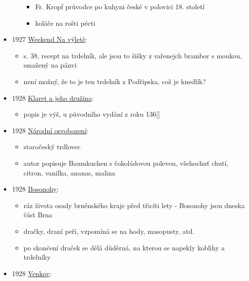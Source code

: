 \begin{itemize}
\begin{itemize}
    \begin{itemize}
    \tightlist
    \item
      Fr. Kropf průvodce po kuhyni české v polovici 18. století
    \item
      koláče na rošti pécti
    \end{itemize}
  \end{itemize}
\item
  1927
  \href{https://ndk.cz/view/uuid:a6e51320-373c-11ee-973a-005056827e51?page=uuid\%3A7905381e-5d69-48f7-97ca-9e0d2c8b5023&fulltext=trdeln\%C3\%ADk}{Weekend
  Na výletě}:

  \begin{itemize}
  \tightlist
  \item
    s. 38, recept na trdelník, ale jsou to šišky z vařenejch brambor s
    moukou, smažený na pánvi
  \item
    není možný, že to je ten trdelník z Podřipska, což je knedlík?
  \end{itemize}
\item
  1928
  \href{https://sources.cms.flu.cas.cz/src/index.php?s=v&bookid=833&page=3}{Klaret
  a jeho družina}:

  \begin{itemize}
  \tightlist
  \item
    popis je výš, u původního vydání z roku 136{[}{]}
  \end{itemize}
\item
  1928
  \href{https://ceskadigitalniknihovna.cz/view/uuid:f80a63e0-611a-11e1-acfb-0013d398622b?page=uuid\%3Ada4abcb0-9dd7-11e7-a093-005056825209&fulltext=trdlovec&source=nkp}{Národní
  osvobození}:

  \begin{itemize}
  \tightlist
  \item
    staročeský trdlovec
  \item
    autor popisuje Baumkuchen s čokoládovou polevou, všehochuť chutí,
    citron, vanilka, ananas, malina
  \end{itemize}
\item
  1928
  \href{https://ceskadigitalniknihovna.cz/view/uuid:d9b0f410-125b-11ed-8635-005056827e52?page=uuid\%3A82be2751-0e47-4147-a2f9-395b5608b5ce&fulltext=trdeln\%C3\%ADk\%20OR\%20trdeln\%C3\%ADky\%20OR\%20trdeln\%C3\%ADk\%C5\%AF&source=mzk}{Bosonohy}:

  \begin{itemize}
  \tightlist
  \item
    ráz života osady brněnského kraje před třicíti lety - Bosonohy jsou
    dneska část Brna
  \item
    dračky, draní peří, vzpomíná se na hody, masopusty, atd.
  \item
    po skončení draček se dělá důděrná, na kterou se napekly koblihy a
    trdelníky
  \end{itemize}
\item
  1928
  \href{https://ceskadigitalniknihovna.cz/uuid/uuid:25f83680-128e-11e8-8ee4-005056825209}{Venkov}:


\end{itemize}
